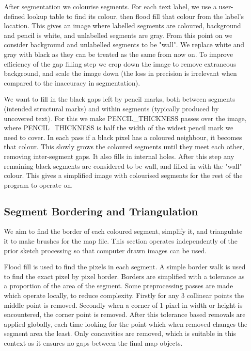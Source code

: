\documentclass{IEEEtran}
\begin{document}
After segmentation we colourise segments. For each text label, we use a user-defined lookup table to find its colour, then flood fill that colour from the label's location. This gives an image where labelled segments are coloured, background and pencil is white, and unlabelled segments are gray. From this point on we consider background and unlabelled segments to be "wall". We replace white and gray with black as they can be treated as the same from now on. To improve efficiency of the gap filling step we crop down the image to remove extraneous background, and scale the image down (the loss in precision is irrelevant when compared to the inaccuracy in segmentation). 

We want to fill in the black gaps left by pencil marks, both between segments (intended structural marks) and within segments (typically produced by uncovered text). For this we make PENCIL\_THICKNESS passes over the image, where PENCIL\_THICKNESS is half the width of the widest pencil mark we need to cover. In each pass if a black pixel has a coloured neighbour, it becomes that colour. This slowly grows the coloured segments until they meet each other, removing inter-segment gaps. It also fills in internal holes. After this step any remaining black segments are considered to be wall, and filled in with the "wall" colour. This gives a simplified image with colourised segments for the rest of the program to operate on.

\subsection{Segment Bordering and Triangulation}

We aim to find the border of each coloured segment, simplify it, and triangulate it to make brushes for the map file. This section operates independently of the prior sketch processing so that computer drawn images can be used.

Flood fill is used to find the pixels in each segment. A simple border walk is used to find the exact pixel by pixel border. Borders are simplified with a tolerance as a proportion of the area of the segment. Some preprocessing passes are made which operate locally, to reduce complexity. Firstly for any 3 collinear points the middle point is removed. Secondly when a corner of 1 pixel in width or height is encountered, the corner point is removed. After this tolerance based removals are applied globally, each time looking for the point which when removed changes the segment area the least. Only concavities are removed, which is suitable in this context as it ensures no gaps between the final map objects.
\end{document}
